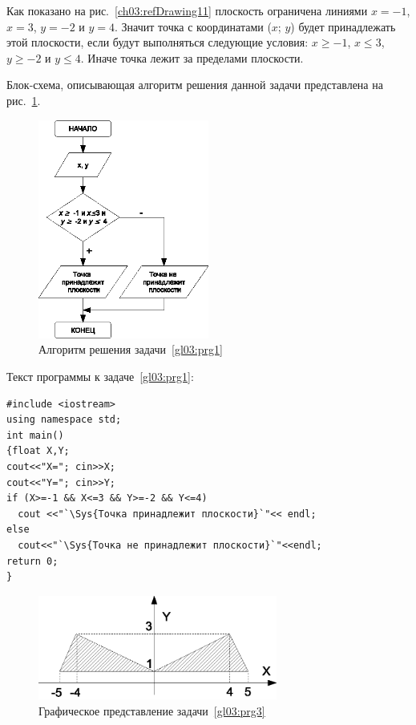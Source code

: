 Как показано на рис.~\ref{ch03:refDrawing11} плоскость ограничена линиями $x=-1$, $x=3$,
$y=-2$ и $y=4$. Значит точка с координатами ($x$;
$y$) будет принадлежать этой плоскости, если будут выполняться следующие условия: 
$x\geq -1$, $x\leq3$, $y\geq -2$ и $y\leq4$. Иначе точка лежит за пределами плоскости.

Блок-схема, описывающая алгоритм решения данной задачи представлена на рис.~\ref{ch03:refDrawing12}.

\begin{figure}[htb]
\begin{center}
\includegraphics[width=0.5\textwidth]{img/ris_3_13}
\caption{Алгоритм решения задачи~\ref{gl03:prg1}}
\label{ch03:refDrawing12}
\end{center}
\end{figure}

Текст программы к задаче~\ref{gl03:prg1}:
\begin{lstlisting}
#include <iostream>
using namespace std;
int main()
{float X,Y;
cout<<"X="; cin>>X;
cout<<"Y="; cin>>Y;
if (X>=-1 && X<=3 && Y>=-2 && Y<=4)
  cout <<"`\Sys{Точка принадлежит плоскости}`"<< endl;
else 
  cout<<"`\Sys{Точка не принадлежит плоскости}`"<<endl;
return 0;
}
\end{lstlisting}


\begin{figure}[htb]
\begin{center}
\includegraphics[width=0.7\textwidth]{img/ris_3_14}
\caption{Графическое представление задачи~\ref{gl03:prg3}}
\label{ch03:refDrawing13}
\end{center}
\end{figure}

